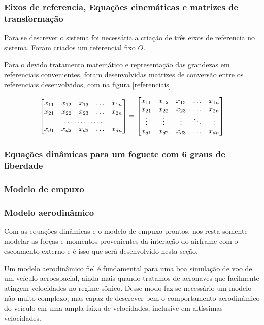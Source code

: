 \documentclass[10pt,fleqn,a4paper,twoside]{article}
\begin{document}
\subsubsection{Eixos de referencia, Equações cinemáticas e matrizes de transformação}
Para se descrever o sistema foi necessária a criação de três eixos de referencia no sistema. Foram criados um referencial fixo $ O $.

Para o devido tratamento matemático e representação das grandezas em referenciais convenientes, foram desenvolvidas matrizes de conversão entre os referenciais desenvolvidos, com na figura \ref{referenciais}

\begin{equation}
\begin{bmatrix}
x_{11}       & x_{12} & x_{13} & \dots & x_{1n} \\
x_{21}       & x_{22} & x_{23} & \dots & x_{2n} \\
\hdotsfor{5} \\
x_{d1}       & x_{d2} & x_{d3} & \dots & x_{dn}
\end{bmatrix}
=
\begin{bmatrix}
x_{11} & x_{12} & x_{13} & \dots  & x_{1n} \\
x_{21} & x_{22} & x_{23} & \dots  & x_{2n} \\
\vdots & \vdots & \vdots & \ddots & \vdots \\
x_{d1} & x_{d2} & x_{d3} & \dots  & x_{dn}
\end{bmatrix}
\end{equation}


\subsubsection{Equações dinâmicas para um foguete com 6 graus de liberdade}

\subsubsection{Modelo de empuxo}

\subsubsection{Modelo aerodinâmico}
Com as equações dinâmicas e o modelo de empuxo prontos, nos resta somente modelar as forças e momentos provenientes da interação do airframe com o escoamento externo e é isso que será desenvolvido nesta seção.

Um modelo aerodinâmico fiel é fundamental para uma boa simulação de voo de um veículo aeroespacial, ainda mais quando tratamos de aeronaves que facilmente atingem velocidades no regime sônico. Desse modo faz-se necessário um modelo não muito complexo, mas capaz de descrever bem o comportamento aerodinâmico do veículo em uma ampla faixa de velocidades, inclusive em altíssimas velocidades.
\end{document}
